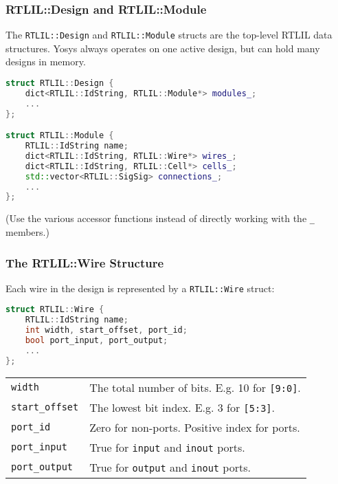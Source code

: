 \subsubsection{RTLIL::Design and RTLIL::Module}

\begin{frame}[t, fragile]{\subsubsecname}
The {\tt RTLIL::Design} and {\tt RTLIL::Module} structs are the top-level RTLIL
data structures. Yosys always operates on one active design, but can hold many designs in memory.

\bigskip
\begin{lstlisting}[xleftmargin=1cm, basicstyle=\ttfamily\fontsize{8pt}{10pt}\selectfont, language=C++]
struct RTLIL::Design {
    dict<RTLIL::IdString, RTLIL::Module*> modules_;
    ...
};

struct RTLIL::Module {
    RTLIL::IdString name;
    dict<RTLIL::IdString, RTLIL::Wire*> wires_;
    dict<RTLIL::IdString, RTLIL::Cell*> cells_;
    std::vector<RTLIL::SigSig> connections_;
    ...
};
\end{lstlisting}

(Use the various accessor functions instead of directly working with the {\tt *\_} members.)
\end{frame}

\subsubsection{The RTLIL::Wire Structure}

\begin{frame}[t, fragile]{\subsubsecname}
Each wire in the design is represented by a {\tt RTLIL::Wire} struct:

\medskip
\begin{lstlisting}[xleftmargin=1cm, basicstyle=\ttfamily\fontsize{8pt}{10pt}\selectfont, language=C++]
struct RTLIL::Wire {
    RTLIL::IdString name;
    int width, start_offset, port_id;
    bool port_input, port_output;
    ...
};
\end{lstlisting}

\medskip
\hfil\begin{tabular}{p{3cm}l}
{\tt width} \dotfill & The total number of bits. E.g. 10 for {\tt [9:0]}. \\
{\tt start\_offset} \dotfill & The lowest bit index. E.g. 3 for {\tt [5:3]}. \\
{\tt port\_id} \dotfill & Zero for non-ports. Positive index for ports. \\
{\tt port\_input} \dotfill & True for {\tt input} and {\tt inout} ports. \\
{\tt port\_output} \dotfill & True for {\tt output} and {\tt inout} ports. \\
\end{tabular}
\end{frame}

